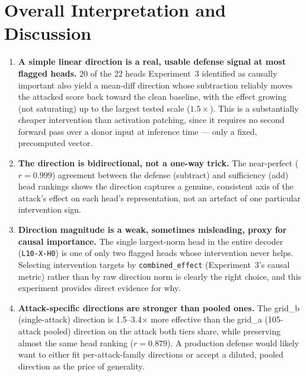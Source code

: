 \documentclass[11pt]{article}
\begin{document}
\section{Overall Interpretation and Discussion}

\begin{enumerate}
  \item \textbf{A simple linear direction is a real, usable defense signal
        at most flagged heads.} 20 of the 22 heads Experiment~3 identified
        as causally important also yield a mean-diff direction whose
        subtraction reliably moves the attacked score back toward the
        clean baseline, with the effect growing (not saturating) up to the
        largest tested scale ($1.5\times$). This is a substantially cheaper
        intervention than activation patching, since it requires no second
        forward pass over a donor input at inference time --- only a fixed,
        precomputed vector.
  \item \textbf{The direction is bidirectional, not a one-way trick.} The
        near-perfect ($r{=}0.999$) agreement between the defense (subtract)
        and sufficiency (add) head rankings shows the direction captures a
        genuine, consistent axis of the attack's effect on each head's
        representation, not an artefact of one particular intervention
        sign.
  \item \textbf{Direction magnitude is a weak, sometimes misleading, proxy
        for causal importance.} The single largest-norm head in the entire
        decoder (\texttt{L10-X-H0}) is one of only two flagged heads whose
        intervention never helps. Selecting intervention targets by
        \texttt{combined\_effect} (Experiment~3's causal metric) rather
        than by raw direction norm is clearly the right choice, and this
        experiment provides direct evidence for why.
  \item \textbf{Attack-specific directions are stronger than pooled ones.}
        The grid\_b (single-attack) direction is 1.5--3.4$\times$ more
        effective than the grid\_a (105-attack pooled) direction on the
        attack both tiers share, while preserving almost the same head
        ranking ($r{=}0.879$). A production defense would likely want to
        either fit per-attack-family directions or accept a diluted,
        pooled direction as the price of generality.
\end{enumerate}
\end{document}
